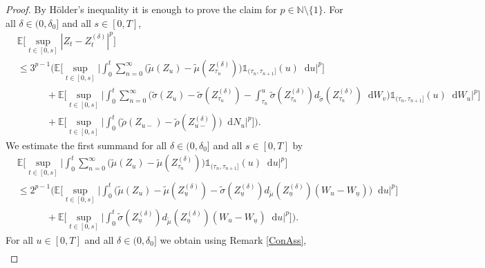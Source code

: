\documentclass[11pt,a4paper]{article}
\numberwithin{equation}{section}
\theoremstyle{definition}
\newcommand{\E}{{\mathbb{E}}}
\newcommand{\N}{{\mathbb{N}}}
\newcommand{\diff}{\mathop{}\!\mathrm{d}}
\begin{document}
\begin{proof}
By Hölder's inequality it is enough to prove the claim for $p\in\N\setminus \{1\}$.  
For all $\delta\in(0,\delta_0]$ and all $s\in[0,T]$,
\begin{equation}\label{M1}
    \begin{aligned}
    &\E\Big[\sup_{t\in[0,s]}|Z_t - Z_t^{(\delta)}|^p\Big]\\
    &\leq 3^{p-1} \Big(\E\Big[\sup_{t\in[0,s]} \Big|  \int_0^t \sum_{n=0}^{\infty} \big(\widetilde\mu(Z_u) - \widetilde\mu(Z^{(\delta)}_{\tau_n})\big) \mathds{1}_{(\tau_n,\tau_{n+1}]}(u) \diff u\Big|^p\Big]\\
    &\quad\quad\quad + \E\Big[\sup_{t\in[0,s]} \Big| \int_0^t \sum_{n=0}^{\infty} \Big(\widetilde\sigma(Z_u) -\widetilde\sigma(Z^{(\delta)}_{\tau_n}) - \int_{\tau_n}^u \widetilde\sigma (Z^{(\delta)}_{\tau_n}) d_{\widetilde\sigma} (Z^{(\delta)}_{\tau_n}) \diff W_v \Big)\mathds{1}_{(\tau_n,\tau_{n+1}]}(u) \diff W_u\Big|^p\Big]\\
    &\quad\quad\quad +\E\Big[\sup_{t\in[0,s]} \Big| \int_0^t \big(\widetilde\rho(Z_{u-}) - \widetilde\rho(Z^{(\delta)}_{u-})\big) \diff N_u\Big|^p\Big]\Big).
    \end{aligned}
\end{equation}
We estimate the first summand for all $\delta\in(0,\delta_0]$ and all $s\in[0,T]$ by
\begin{equation}\label{M2a}
    \begin{aligned}
    &\E\Big[\sup_{t\in[0,s]} \Big|  \int_0^t \sum_{n=0}^{\infty} \big(\widetilde\mu(Z_u) - \widetilde\mu(Z^{(\delta)}_{\tau_n})\big) \mathds{1}_{(\tau_n,\tau_{n+1}]}(u) \diff u\Big|^p\Big]\\
    &\leq 2^{p-1}\Big( \E\Big[\sup_{t\in[0,s]} \Big|  \int_0^t  \big(\widetilde\mu(Z_u) - \widetilde\mu(Z^{(\delta)}_{\underline u}) - \widetilde\sigma(Z^{(\delta)}_{\underline u}) d_{\widetilde\mu}(Z^{(\delta)}_{\underline u})(W_u-W_{\underline u})\big)  \diff u\Big|^p\Big] \\
    &\quad\quad\quad +\E\Big[\sup_{t\in[0,s]} \Big|  \int_0^t  \widetilde\sigma(Z^{(\delta)}_{\underline u}) d_{\widetilde\mu}(Z^{(\delta)}_{\underline u}) (W_u-W_{\underline u}) \diff u\Big|^p\Big]\Big) .
    \end{aligned}
\end{equation}
For all $u\in [0,T]$ and all $\delta\in(0,\delta_0]$ we obtain using Remark \ref{ConAss},
\begin{equation}\label{M3}
    \begin{aligned}

\end{aligned}
\end{equation}
\end{proof}
\end{document}
